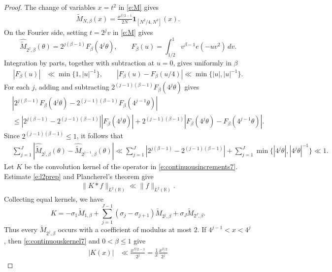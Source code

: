 \documentclass[12pt,reqno]{amsart}
\numberwithin{equation}{section}
\theoremstyle{definition}
\theoremstyle{remark}
\begin{document}
\begin{proof}
The change of variables \(x=t^2\) in \eqref{e:M} gives
\begin{align}\label{e:continuouskernel7}
 \widetilde M_{N,\beta}(x)
 =
 \frac{x^{\beta/2-1}}{2N}
 \mathbf1_{[N^2/4,N^2]}(x).
\end{align}
On the Fourier side, setting \(t=2^jv\) in \eqref{e:M} gives
\[
 \widehat{\widetilde M}_{2^j,\beta}(\theta)
 =
 2^{j(\beta-1)}F_\beta(4^j\theta),
 \qquad
 F_\beta(u)=
 \int_{1/2}^1v^{\beta-1}e(-uv^2)\,dv.
\]
Integration by parts, together with subtraction at \(u=0\), gives
uniformly in \(\beta\)
\begin{align}\label{e:Fbetabounds7}
 |F_\beta(u)|
 &\ll\min\{1,|u|^{-1}\},\qquad 
 |F_\beta(u)-F_\beta(u/4)|
 \ll\min\{|u|,|u|^{-1}\}.
\end{align}
For each \(j\), adding and subtracting
\(2^{(j-1)(\beta-1)}F_\beta(4^j\theta)\) gives
\begin{align*}
 &\left|
 2^{j(\beta-1)}F_\beta(4^j\theta)
 -
 2^{(j-1)(\beta-1)}F_\beta(4^{j-1}\theta)
 \right|\\
 &\leq
 \left|2^{j(\beta-1)}-2^{(j-1)(\beta-1)}\right|
 |F_\beta(4^j\theta)|+
 2^{(j-1)(\beta-1)}
 \left|F_\beta(4^j\theta)-F_\beta(4^{j-1}\theta)\right|.
\end{align*}
Since \(2^{(j-1)(\beta-1)}\leq1\), it follows that
\begin{align}\label{e:l2prep}
 &\sum_{j=1}^J
 \left|
 \widehat{\widetilde M}_{2^j,\beta}(\theta)
 -
 \widehat{\widetilde M}_{2^{j-1},\beta}(\theta)
 \right|\ll
 \sum_{j=1}^J
 \left|
 2^{j(\beta-1)}-2^{(j-1)(\beta-1)}
 \right|
 +
 \sum_{j=1}^J
 \min\{|4^j\theta|,|4^j\theta|^{-1}\} \ll 1. \qquad 
\end{align}
Let \(K\) be the convolution kernel of the operator in
\eqref{e:continuousincrements7}.  Estimate \eqref{e:l2prep}
and Plancherel's theorem give
\begin{align}\label{e:continuousincrementsL27}
 \|K*f\|_{L^2(\mathbb R)}
 \ll \|f\|_{L^2(\mathbb R)}.
\end{align}
Collecting equal kernels, we have
\[
 K
 =
 -\sigma_1\widetilde M_{1,\beta}
 +\sum_{j=1}^{J-1}
   (\sigma_j-\sigma_{j+1})\widetilde M_{2^j,\beta}
 +\sigma_J\widetilde M_{2^J,\beta}.
\]
Thus every \(\widetilde M_{2^j,\beta}\) occurs with a coefficient of
modulus at most \(2\).  If \(4^{j-1}<x<4^j\), then
\eqref{e:continuouskernel7} and \(0<\beta\leq1\) give
\begin{align*}
 |K(x)|
 &\ll
 \frac{x^{\beta/2-1}}{2^j}
 =
 \frac1x\frac{x^{\beta/2}}{2^j}

\end{align*}
\end{proof}
\end{document}
